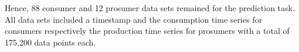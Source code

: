 Hence, 88 consumer and 12 prosumer data sets remained for the prediction task. All data sets included a timestamp and the consumption time series for consumers respectively the production time series for prosumers with a total of 175,200 data points each.

